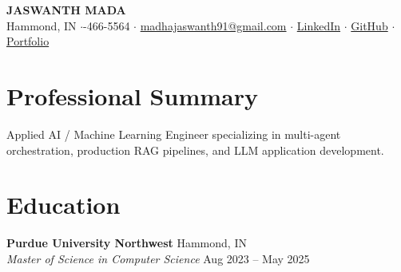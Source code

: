 \documentclass[10pt, letterpaper]{article}
\begin{document}
\begin{center}
    {\Huge \bfseries \color{primary} JASWANTH MADA} \\[2pt]
    \small
    Hammond, IN \quad$\cdot$-466-5564 \quad$\cdot$\quad 
    \href{mailto:madhajaswanth91@gmail.com}{madhajaswanth91@gmail.com} \quad$\cdot$\quad 
    \href{https://www.linkedin.com/in/jaswanthmadha/}{LinkedIn} \quad$\cdot$\quad 
    \href{https://github.com/Jaswanth19-596/}{GitHub} \quad$\cdot$\quad 
    \href{https://madajaswanth.netlify.app/}{Portfolio}
\end{center}

\vspace{-6pt}

\section{Professional Summary}
Applied AI / Machine Learning Engineer specializing in multi-agent orchestration, production RAG pipelines, and LLM application development.

\section{Education}
\textbf{Purdue University Northwest} \hfill Hammond, IN \\
\textit{Master of Science in Computer Science} \hfill Aug 2023 -- May 2025

\end{document}
